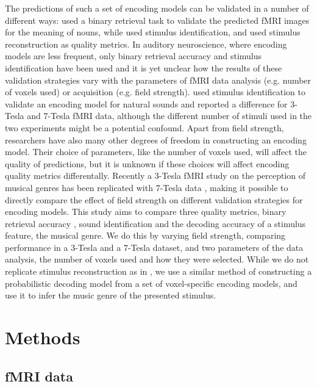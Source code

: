 The predictions of such a set of encoding models can be validated in a number
of different ways:  \cite{ML08} used a binary retrieval task to validate the
predicted f{MRI} images for the meaning of nouns, while \cite{KG+08} used
stimulus identification, and \cite{NG09} used stimulus reconstruction as
quality metrics.  In auditory neuroscience, where encoding models are less
frequent, only binary retrieval accuracy \cite{CTK+2012} and stimulus
identification \cite{SF14} have been used and it is yet unclear how the results
of these validation strategies vary with the parameters of f{MRI} data analysis
(e.g. number of voxels used)  or acquisition (e.g. field strength).
\cite{SF14} used stimulus identification to validate an encoding model for
natural sounds and reported a difference for 3-Tesla and 7-Tesla f{MRI} data,
although the different number of stimuli used in the two experiments might be a
potential confound.  Apart from field strength, researchers have also many
other degrees of freedom in constructing an encoding model.  Their choice of
parameters, like the number of voxels used, will affect the quality of
predictions, but it is unknown if these choices will affect encoding quality
metrics differentally.  Recently a 3-Tesla f{MRI} study on the perception of
musical genres \cite{CTK+2012} has been replicated with 7-Tesla data
\cite{HDH+2015}, making it possible to directly compare the effect of field
strength on different validation strategies for encoding models.  This study
aims to compare three quality metrics, binary retrieval accuracy \cite{ML08},
sound identification \cite{KG+08} \cite{SF14} and the decoding accuracy of a
stimulus feature, the musical genre. We do this by varying field strength,
comparing performance in a 3-Tesla and a 7-Tesla dataset, and two parameters of
the data analysis, the number of voxels used and how they were selected.  While
we do not replicate stimulus reconstruction as in \cite{NG09}, we use a similar
method of constructing a probabilistic decoding model from a set of
voxel-specific encoding models, and use it to infer the music genre of the
presented stimulus.


\section*{Methods}

\cite{HBI+14,HDH+2015}

\subsection*{fMRI data}

